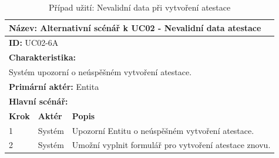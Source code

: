 \vspace{-1mm} %
\renewcommand{\arraystretch}{1.5} %
\begin{table}[h]
	\centering
	\begin{tabular}{|p{1cm}|p{2cm}|p{10cm}|}
		\hline
		\multicolumn{3}{|l|}{\textbf{Název:} Alternativní scénář k UC02 - Nevalidní data atestace} \\ \hline
		\multicolumn{3}{|l|}{\textbf{ID:} UC02-6A} \\ \hline
		\multicolumn{3}{|l|}{\textbf{Charakteristika:}} \\ \hline
		\multicolumn{3}{|l|}{Systém upozorní o neúspěšném vytvoření atestace.} \\ \hline
		\multicolumn{3}{|l|}{\textbf{Primární aktér:} Entita} \\ \hline
		\multicolumn{3}{|l|}{\textbf{Hlavní scénář:}} \\ \hline
		\textbf{Krok} & \textbf{Aktér} & \textbf{Popis} \\ \hline
		1 & Systém & Upozorní Entitu o neúspěšném vytvoření atestace. \\ \hline
		2 & Systém & Umožní vyplnit formulář pro vytvoření atestace znovu. \\ \hline

		
	\end{tabular}
	\vspace{10pt} %
	\caption{Případ užití: Nevalidní data při vytvoření atestace}
	\label{tab:usecase-alt-attestation-creation}
\end{table}
\renewcommand{\arraystretch}{1} %






